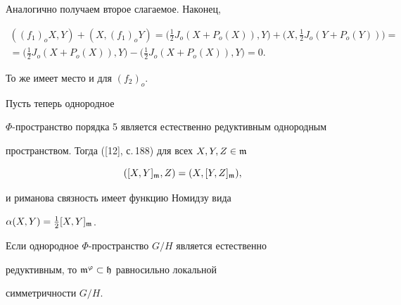 \begin{pf}
Аналогично получаем второе слагаемое. Наконец,


\begin{multline*}


((f_1)_oX,Y) + (X,


(f_1)_oY) = \bigg(\frac{1}{2}J_o(X + P_o(X)), Y\bigg) + \bigg(X,


\frac{1}{2}J_o(Y+P_o(Y))\bigg) =\\


= \bigg(\frac{1}{2}J_o(X + P_o(X)), Y\bigg) -


\bigg(\frac{1}{2}J_o(X +P_o(X)), Y\bigg) = 0.


\end{multline*}


То же имеет место и для $(f_2)_o$.


\end{pf}





Пусть теперь однородное


$\Phi$-пространство порядка 5 является естественно редуктивным однородным


пространством. Тогда ([12], с.\,188) для всех $X,Y,Z \in \frak{m}$


\begin{equation}\label{21}


([X,Y]_{\frak{m}},Z)=(X,[Y,Z]_{\frak{m}}),


\end{equation}


и риманова связность имеет функцию Номидзу вида


$\alpha(X,Y)=\frac{1}{2}[X,Y]_{\frak{m}}$.





\begin{lem}


Если однородное $\Phi$-пространство $G/H$ является естественно


редуктивным, то $\frak{m}^\varphi \subset \frak{h}$ равносильно локальной


симметричности $G/H$.


\end{lem}





